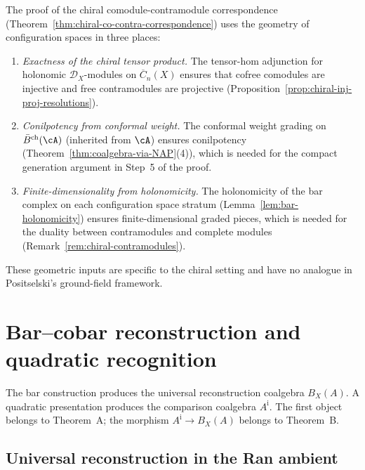 \begin{remark}
\label{rem:config-space-role}
The proof of the chiral comodule-contramodule correspondence
(Theorem~\ref{thm:chiral-co-contra-correspondence}) uses the
geometry of configuration spaces in three places:
\begin{enumerate}
\item \emph{Exactness of the chiral tensor product.}
 The tensor-hom adjunction for holonomic $\mathcal{D}_X$-modules
 on $\overline{C}_n(X)$ ensures that cofree comodules are injective
 and free contramodules are projective
 (Proposition~\ref{prop:chiral-inj-proj-resolutions}).
\item \emph{Conilpotency from conformal weight.}
 The conformal weight grading on $\bar{B}^{\mathrm{ch}}(\cA)$
 (inherited from $\cA$) ensures conilpotency
 (Theorem~\ref{thm:coalgebra-via-NAP}(4)), which is needed for
 the compact generation argument in Step~5 of the proof.
\item \emph{Finite-dimensionality from holonomicity.}
 The holonomicity of the bar complex on each configuration space
 stratum (Lemma~\ref{lem:bar-holonomicity}) ensures
 finite-dimensional graded pieces, which is
 needed for the duality between contramodules and complete modules
 (Remark~\ref{rem:chiral-contramodules}).
\end{enumerate}
These geometric inputs are specific to the chiral setting and have
no analogue in Positselski's ground-field framework.
\end{remark}


\section{Bar--cobar reconstruction and quadratic recognition}
\label{sec:bar-cobar-inversion-quasi-iso}

The bar construction produces the universal reconstruction coalgebra
\(B_X(A)\).  A quadratic presentation produces the comparison
coalgebra \(A^{\mathrm i}\).  The first object belongs to Theorem~A;
the morphism \(A^{\mathrm i}\to B_X(A)\) belongs to Theorem~B.

\subsection{Universal reconstruction in the Ran ambient}
\label{sec:theorem-A-platonic}

